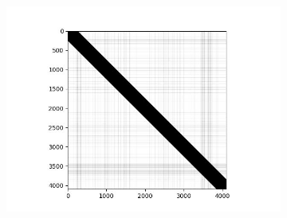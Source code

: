 \begin{figure}[h]
    \centering
    \begin{subfigure}[b]{0.49\textwidth}
        \includegraphics[width=1\textwidth]{images/0_local_and_tfidf.jpg}
        \caption{}
        \label{fig:tfidf_mapping1}
    \end{subfigure}
    

\end{figure}
